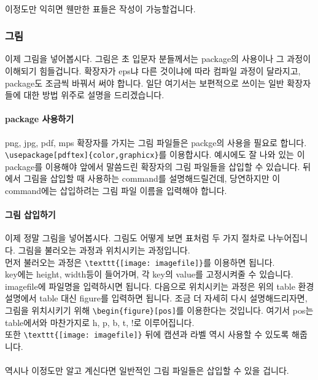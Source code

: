 \paragraph{}
이정도만 익히면 웬만한 표들은 작성이 가능할겁니다.

\subsubsection{그림}
이제 그림을 넣어봅시다.
그림은 초 입문자 분들께서는 package의 사용이나 그 과정이 이해되기 힘들겁니다.
확장자가 eps냐 다른 것이냐에 따라 컴파일 과정이 달라지고, package도 조금씩 바꿔서 써야 합니다.
일단 여기서는 보편적으로 쓰이는 일반 확장자들에 대한 방법 위주로 설명을 드리겠습니다.

\paragraph{package 사용하기}
png, jpg, pdf, mps 확장자를 가지는 그림 파일들은 packge의 사용을 필요로 합니다.
\verb|\usepackage[pdftex]{color,graphicx}|를 이용합시다.
예시에도 잘 나와 있는 이 package를 이용해야 앞에서 말씀드린 확장자의 그림 파일들을 삽입할 수 있습니다.
뒤에서 그림을 삽입할 때 사용하는 command를 설명해드릴건데, 당연하지만 이 command에는 삽입하려는 그림 파일 이름을 입력해야 합니다.

\paragraph{그림 삽입하기}
이제 정말 그림을 넣어봅시다.
그림도 어떻게 보면 표처럼 두 가지 절차로 나누어집니다.
그림을 불러오는 과정과 위치시키는 과정입니다.\\
먼저 불러오는 과정은 \verb|\texttt{[image: imagefile]}|를 이용하면 됩니다.\\
key에는 height, width등이 들어가며, 각 key의 value를 고정시켜줄 수 있습니다.
imagefile에 파일명을 입력하시면 됩니다.
다음으로 위치시키는 과정은 위의 table 환경 설명에서 table 대신 figure를 입력하면 됩니다.
조금 더 자세히 다시 설명해드리자면, 그림을 위치시키기 위해 \verb|\begin{figure}[pos]|를 이용한다는 것입니다.
여기서 pos는 table에서와 마찬가지로 h, p, b, t, !로 이루어집니다.\\
또한 \verb|\texttt{[image: imagefile]}| 뒤에 캡션과 라벨 역시 사용할 수 있도록 해줍니다.

\paragraph{}
역시나 이정도만 알고 계신다면 일반적인 그림 파일들은 삽입할 수 있을 겁니다.


